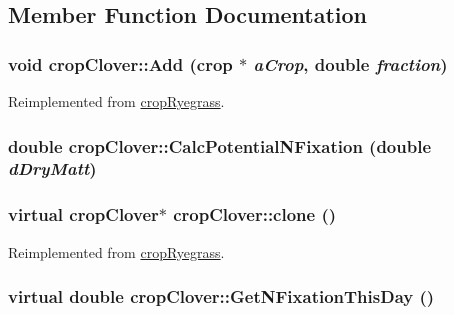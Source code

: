 \subsection{Member Function Documentation}
\hypertarget{classcrop_clover_ab0d1a2a7eb7738bac0cb6456a95cf90c}{
\subsubsection[{Add}]{\setlength{\rightskip}{0pt plus 5cm}void cropClover::Add ({\bf crop} $\ast$ {\em aCrop}, \/  double {\em fraction})}}
\label{classcrop_clover_ab0d1a2a7eb7738bac0cb6456a95cf90c}


Reimplemented from \hyperlink{classcrop_ryegrass_a3ee92e29d981a5bcae487e10f5aa18d4}{cropRyegrass}.\hypertarget{classcrop_clover_a5747ba184ba2174f4ace80757d75f9a5}{
\subsubsection[{CalcPotentialNFixation}]{\setlength{\rightskip}{0pt plus 5cm}double cropClover::CalcPotentialNFixation (double {\em dDryMatt})}}
\label{classcrop_clover_a5747ba184ba2174f4ace80757d75f9a5}
\hypertarget{classcrop_clover_afe134102e033bd1326eb955327b4d902}{
\subsubsection[{clone}]{\setlength{\rightskip}{0pt plus 5cm}virtual {\bf cropClover}$\ast$ cropClover::clone ()}}
\label{classcrop_clover_afe134102e033bd1326eb955327b4d902}


Reimplemented from \hyperlink{classcrop_ryegrass_af7eb9cc81f755e89fc1486cc242b8b84}{cropRyegrass}.\hypertarget{classcrop_clover_a59fd79a6a70369bb7bae83417641ddef}{
\subsubsection[{GetNFixationThisDay}]{\setlength{\rightskip}{0pt plus 5cm}virtual double cropClover::GetNFixationThisDay ()}}
\label{classcrop_clover_a59fd79a6a70369bb7bae83417641ddef}


